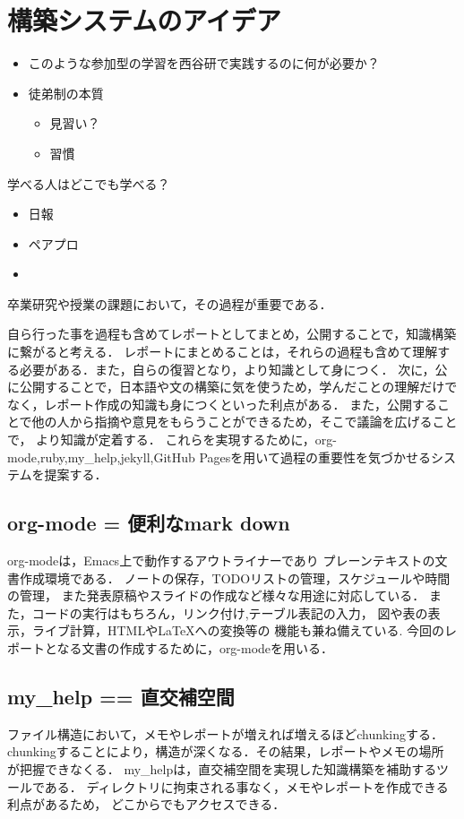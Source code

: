\documentclass[a4,p11]{article}
\begin{document}
\section{構築システムのアイデア}
\label{sec:orge176130}
\begin{itemize}
\item このような参加型の学習を西谷研で実践するのに何が必要か？
\item 徒弟制の本質
\begin{itemize}
\item 見習い？
\item 習慣
\end{itemize}
\end{itemize}
学べる人はどこでも学べる？

\begin{itemize}
\item 日報
\item ペアプロ
\item 
\end{itemize}

卒業研究や授業の課題において，その過程が重要である．

自ら行った事を過程も含めてレポートとしてまとめ，公開することで，知識構築に繋がると考える．
レポートにまとめることは，それらの過程も含めて理解する必要がある．また，自らの復習となり，より知識として身につく．
次に，公に公開することで，日本語や文の構築に気を使うため，学んだことの理解だけでなく，レポート作成の知識も身につくといった利点がある．
また，公開することで他の人から指摘や意見をもらうことができるため，そこで議論を広げることで，
より知識が定着する．
これらを実現するために，org-mode,ruby,my\_help,jekyll,GitHub Pagesを用いて過程の重要性を気づかせるシステムを提案する．

\subsection{org-mode = 便利なmark down}
\label{sec:org16f643f}
org-modeは，Emacs上で動作するアウトライナーであり
プレーンテキストの文書作成環境である．
ノートの保存，TODOリストの管理，スケジュールや時間の管理，
また発表原稿やスライドの作成など様々な用途に対応している．
また，コードの実行はもちろん，リンク付け,テーブル表記の入力，
図や表の表示，ライブ計算，HTMLや\LaTeX{}への変換等の
機能も兼ね備えている.
今回のレポートとなる文書の作成するために，org-modeを用いる．

\subsection{my\_help == 直交補空間}
\label{sec:orgc367e08}
ファイル構造において，メモやレポートが増えれば増えるほどchunkingする．
chunkingすることにより，構造が深くなる．その結果，レポートやメモの場所
が把握できなくる．
my\_helpは，直交補空間を実現した知識構築を補助するツールである．
ディレクトリに拘束される事なく，メモやレポートを作成できる利点があるため，
どこからでもアクセスできる．
\end{document}
